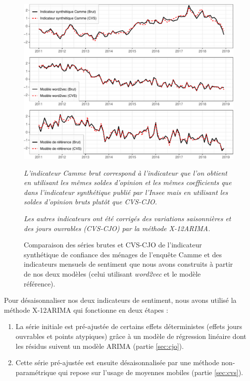 \documentclass[11pt,french,french]{article}
\begin{document}
\begin{figure}[htp]
{\centering\includegraphics[width = \textwidth]{img/rmd-graphCVS-1}}
\captionsetup{margin=0cm,format=hang,justification=justified}
\caption{Comparaison des séries brutes et CVS-CJO de l'indicateur synthétique de confiance des ménages de l'enquête Camme et des indicateurs mensuels de sentiment que nous avons construits à partir de nos deux modèles (celui utilisant  \emph{word2vec} et le modèle référence).}\label{fig:cvscjo}
\footnotesize

\emph{L'indicateur Camme brut correspond à l'indicateur que l'on obtient en utilisant les mêmes soldes d'opinion et les mêmes coefficients que dans l'indicateur synthétique publié par l'Insee mais en utilisant les soldes d'opinion bruts plutôt que CVS-CJO.}

\emph{Les autres indicateurs ont été corrigés des variations saisonnières et des jours ouvrables (CVS-CJO) par la méthode X-12ARIMA.}
\end{figure}

Pour désaisonnaliser nos deux indicateurs de sentiment, nous avons
utilisé la méthode X-12ARIMA qui fonctionne en deux étapes :

\begin{enumerate}
\def\labelenumi{\arabic{enumi}.}
\item
  La série initiale est pré-ajustée de certains effets déterministes
  (effets jours ouvrables et points atypiques) grâce à un modèle de
  régression linéaire dont les résidus suivent un modèle ARIMA (partie
  \ref{sec:cjo}).
\item
  Cette série pré-ajustée est ensuite désaisonnalisée par une méthode
  non-paramétrique qui repose sur l'usage de moyennes mobiles (partie
  \ref{sec:cvs}).
\end{enumerate}
\end{document}
